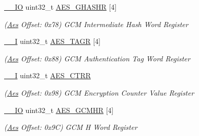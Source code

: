 \begin{DoxyCompactItemize}
\mbox{\label{structAes_a4db7aa8a08eab93be6595f97d7f8db82}} 
\mbox{\hyperlink{core__cm7_8h_aec43007d9998a0a0e01faede4133d6be}{\+\_\+\+\_\+\+IO}} uint32\+\_\+t \mbox{\hyperlink{structAes_a4db7aa8a08eab93be6595f97d7f8db82}{A\+E\+S\+\_\+\+G\+H\+A\+S\+HR}} \mbox{[}4\mbox{]}
\begin{DoxyCompactList}\small\item\em (\mbox{\hyperlink{structAes}{Aes}} Offset\+: 0x78) G\+CM Intermediate Hash Word Register \end{DoxyCompactList}\item 
\mbox{\label{structAes_a3f177b2b392939b4f11d4d1f0955e93e}} 
\mbox{\hyperlink{core__cm7_8h_af63697ed9952cc71e1225efe205f6cd3}{\+\_\+\+\_\+I}} uint32\+\_\+t \mbox{\hyperlink{structAes_a3f177b2b392939b4f11d4d1f0955e93e}{A\+E\+S\+\_\+\+T\+A\+GR}} \mbox{[}4\mbox{]}
\begin{DoxyCompactList}\small\item\em (\mbox{\hyperlink{structAes}{Aes}} Offset\+: 0x88) G\+CM Authentication Tag Word Register \end{DoxyCompactList}\item 
\mbox{\label{structAes_adfb2995e9c58020d0b6b011d2dd95342}} 
\mbox{\hyperlink{core__cm7_8h_af63697ed9952cc71e1225efe205f6cd3}{\+\_\+\+\_\+I}} uint32\+\_\+t \mbox{\hyperlink{structAes_adfb2995e9c58020d0b6b011d2dd95342}{A\+E\+S\+\_\+\+C\+T\+RR}}
\begin{DoxyCompactList}\small\item\em (\mbox{\hyperlink{structAes}{Aes}} Offset\+: 0x98) G\+CM Encryption Counter Value Register \end{DoxyCompactList}\item 
\mbox{\label{structAes_a5cd1fc7cfb0c096e0f687b89af031da5}} 
\mbox{\hyperlink{core__cm7_8h_aec43007d9998a0a0e01faede4133d6be}{\+\_\+\+\_\+\+IO}} uint32\+\_\+t \mbox{\hyperlink{structAes_a5cd1fc7cfb0c096e0f687b89af031da5}{A\+E\+S\+\_\+\+G\+C\+M\+HR}} \mbox{[}4\mbox{]}
\begin{DoxyCompactList}\small\item\em (\mbox{\hyperlink{structAes}{Aes}} Offset\+: 0x9C) G\+CM H Word Register \end{DoxyCompactList}\item 
\mbox{\label{structAes_ae5d05d81bae4fffcba9c53a843732c03}} 

\end{DoxyCompactItemize}
